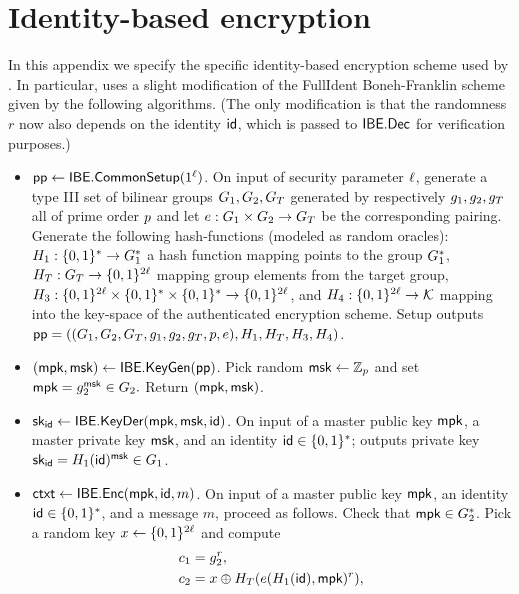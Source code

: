 \section{Identity-based encryption}

In this appendix we specify the specific identity-based encryption scheme used
by \name. In particular, \name uses a slight modification of the FullIdent Boneh-Franklin scheme~\cite{BonehF01} given by the following algorithms. (The only modification is that the randomness $r$ now also depends on the identity $\textsf{id}$, which is passed to $\textsf{IBE.Dec}$ for verification purposes.)
\begin{itemize}
\item $\textsf{pp} \gets \textsf{IBE.CommonSetup}(1^\ell)$. On input of security parameter $\ell$, generate a type III set of bilinear groups $G_1, G_2, G_T$ generated by respectively $g_1, g_2, g_T$ all of prime order $p$ and let $e: G_1 \times G_2 \to G_T$ be the corresponding pairing. Generate the following hash-functions (modeled as random oracles): $H_1: \{0,1\}^* \to G_1^*$ a hash function mapping points to the group $G_1^*$, $H_T : G_T \to \{0,1\}^{2\ell}$ mapping group elements from the target group, $H_3: \{0,1\}^{2\ell} \times \{0,1\}^* \times \{0,1\}^* \to \{0,1\}^{2\ell}$, and $H_4: \{0,1\}^{2\ell} \to \mathcal{K}$ mapping into the key-space of the authenticated encryption scheme.
  Setup outputs $\textsf{pp} = ((G_1, G_2, G_T, g_1, g_2, g_T, p, e), H_1, H_T, H_3, H_4)$.
\item $(\textsf{mpk}, \textsf{msk}) \gets \textsf{IBE.KeyGen}(\textsf{pp})$. Pick random $\textsf{msk} \gets \mathbb{Z}_p$ and set $\textsf{mpk} = g_2^{\textsf{msk}} \in G_2.$ Return $(\textsf{mpk}, \textsf{msk})$.
  \item $\textsf{sk}_{\textsf{id}} \gets \textsf{IBE.KeyDer}(\textsf{mpk}, \textsf{msk}, \textsf{id})$. On input of a master public key $\textsf{mpk}$, a master private key $\textsf{msk}$, and an identity $\textsf{id} \in \{0, 1\}^*$; outputs private key $\textsf{sk}_{\textsf{id}} = H_1(\textsf{id})^{\textsf{msk}} \in G_1$.
  \item $\textsf{ctxt} \gets \textsf{IBE.Enc}(\textsf{mpk}, \textsf{id}, m)$. On input of a master public key $\textsf{mpk}$, an identity $\textsf{id} \in \{0,1\}^*$, and a message $m$, proceed as follows. Check that $\textsf{mpk} \in G_2^*$. Pick a random key $x \gets \{0, 1\}^{2\ell}$ and compute
    \begin{align*}
      c_1 &= g_2^r, \\
      c_2 &= x \oplus \hash_T( \pairsym(\hash_1(\id), \masterpk)^r), \\

\end{align*}
\end{itemize}
